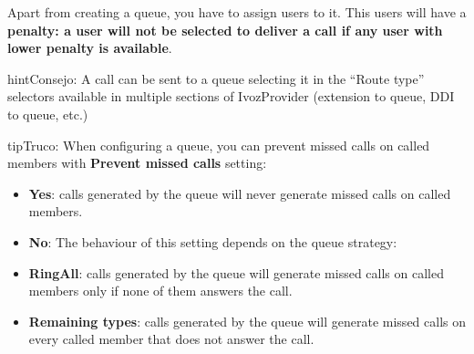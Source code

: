\documentclass[letterpaper,10pt,spanish]{sphinxmanual}
\begin{document}
Apart from creating a queue, you have to assign users to it. This users will have
a \textbf{penalty: a user will not be selected to deliver a call if any user with lower
penalty is available}.

\begin{notice}{hint}{Consejo:}
A call can be sent to a queue selecting it in the ``Route type'' selectors
available in multiple sections of IvozProvider (extension to queue, DDI
to queue, etc.)
\end{notice}

\begin{notice}{tip}{Truco:}
When configuring a queue, you can prevent missed calls on called members with \textbf{Prevent missed calls} setting:
\begin{itemize}
\item {} 
\textbf{Yes}: calls generated by the queue will never generate missed calls on called members.

\item {} 
\textbf{No}: The behaviour of this setting depends on the queue strategy:

\item {} 
\textbf{RingAll}: calls generated by the queue will generate missed calls on called members only if none of them answers the call.

\item {} 
\textbf{Remaining types}: calls generated by the queue will generate missed calls on every called member that does not answer the call.

\end{itemize}
\end{notice}
\end{document}
